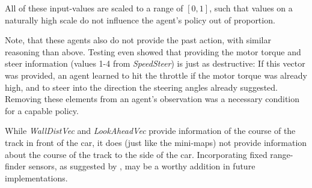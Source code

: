 All of these input-values are scaled to a range of $[0,1]$, such that values on a naturally high scale do not influence the agent's policy out of proportion.

Note, that these agents also do not provide the past action, with similar reasoning than above. Testing even showed that providing the motor torque and steer information (values 1-4 from \textit{SpeedSteer}) is just as destructive: If this vector was provided, an agent learned to hit the throttle if the motor torque was already high, and to steer into the direction the steering angles already suggested. Removing these elements from an agent's observation was a necessary condition for a capable policy.

While \textit{WallDistVec} and \textit{LookAheadVec} provide information of the course of the track in front of the car, it does (just like the mini-maps) not provide information about the course of the track to the side of the car. Incorporating fixed range-finder sensors, as suggested by \cite{loiacono_simulated_2013}, may be a worthy addition in future implementations.